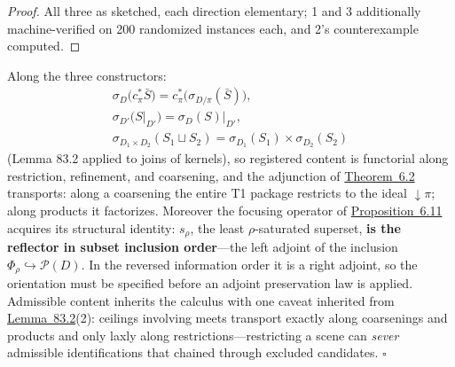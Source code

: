 \begin{proof}

All three as sketched, each direction elementary; 1 and 3 additionally machine-verified on 200 randomized instances each, and 2's counterexample computed.
\end{proof}

\begin{thmplain}

Along the three constructors:
\[\begin{gathered}\sigma_D\big(c_\pi^* \bar S\big) = c_\pi^*\big(\sigma_{D/\pi}(\bar S)\big), \\ \sigma_{D'}\big(S|_{D'}\big) = \sigma_D(S)\big|_{D'}, \\ \sigma_{D_1 \times D_2}(S_1 \sqcup S_2) = \sigma_{D_1}(S_1) \times \sigma_{D_2}(S_2)\end{gathered}\]
(Lemma 83.2 applied to joins of kernels), so registered content is functorial along restriction, refinement, and coarsening, and the adjunction of \hyperlink{stmt:6.2}{Theorem~6.2} transports: along a coarsening the entire T1 package restricts to the ideal \({\downarrow}\pi\); along products it factorizes. Moreover the focusing operator of \hyperlink{stmt:6.11}{Proposition~6.11} acquires its structural identity: \(s_\rho\), the least \(\rho\)-saturated superset, \textbf{is the reflector in subset inclusion order}---\hspace{0pt}the left adjoint of the inclusion \(\Phi_\rho \hookrightarrow \mathcal{P}(D)\). In the reversed information order it is a right adjoint, so the orientation must be specified before an adjoint preservation law is applied. Admissible content inherits the calculus with one caveat inherited from \hyperlink{stmt:83.2}{Lemma~83.2}(2): ceilings involving meets transport exactly along coarsenings and products and only laxly along restrictions---\hspace{0pt}restricting a scene can \emph{sever} admissible identifications that chained through excluded candidates. \(\square\)
\end{thmplain}

